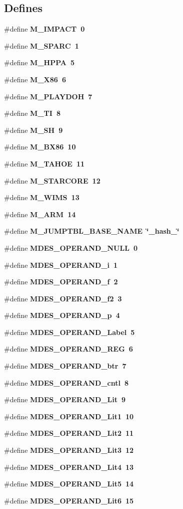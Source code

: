\subsection*{Defines}
\begin{CompactItemize}
\item 
\#define \bf{M\_\-IMPACT}~0
\item 
\#define \bf{M\_\-SPARC}~1
\item 
\#define \bf{M\_\-HPPA}~5
\item 
\#define \bf{M\_\-X86}~6
\item 
\#define \bf{M\_\-PLAYDOH}~7
\item 
\#define \bf{M\_\-TI}~8
\item 
\#define \bf{M\_\-SH}~9
\item 
\#define \bf{M\_\-BX86}~10
\item 
\#define \bf{M\_\-TAHOE}~11
\item 
\#define \bf{M\_\-STARCORE}~12
\item 
\#define \bf{M\_\-WIMS}~13
\item 
\#define \bf{M\_\-ARM}~14
\item 
\#define \bf{M\_\-JUMPTBL\_\-BASE\_\-NAME}~\char`\"{}\_\-hash\_\-\char`\"{}
\item 
\#define \bf{MDES\_\-OPERAND\_\-NULL}~0
\item 
\#define \bf{MDES\_\-OPERAND\_\-i}~1
\item 
\#define \bf{MDES\_\-OPERAND\_\-f}~2
\item 
\#define \bf{MDES\_\-OPERAND\_\-f2}~3
\item 
\#define \bf{MDES\_\-OPERAND\_\-p}~4
\item 
\#define \bf{MDES\_\-OPERAND\_\-Label}~5
\item 
\#define \bf{MDES\_\-OPERAND\_\-REG}~6
\item 
\#define \bf{MDES\_\-OPERAND\_\-btr}~7
\item 
\#define \bf{MDES\_\-OPERAND\_\-cntl}~8
\item 
\#define \bf{MDES\_\-OPERAND\_\-Lit}~9
\item 
\#define \bf{MDES\_\-OPERAND\_\-Lit1}~10
\item 
\#define \bf{MDES\_\-OPERAND\_\-Lit2}~11
\item 
\#define \bf{MDES\_\-OPERAND\_\-Lit3}~12
\item 
\#define \bf{MDES\_\-OPERAND\_\-Lit4}~13
\item 
\#define \bf{MDES\_\-OPERAND\_\-Lit5}~14
\item 
\#define \bf{MDES\_\-OPERAND\_\-Lit6}~15

\end{CompactItemize}
